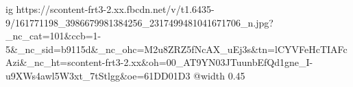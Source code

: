  
 
 
 
 

\ifcmt
  ig https://scontent-frt3-2.xx.fbcdn.net/v/t1.6435-9/161771198_3986679981384256_2317499481041671706_n.jpg?_nc_cat=101&ccb=1-5&_nc_sid=b9115d&_nc_ohc=M2u8ZRZ5fNcAX_uEj3s&tn=lCYVFeHcTIAFcAzi&_nc_ht=scontent-frt3-2.xx&oh=00_AT9YN03JTuunbEfQd1gne_I-u9XWs4awl5W3xt_7tStlgg&oe=61DD01D3
  @width 0.45
\fi
